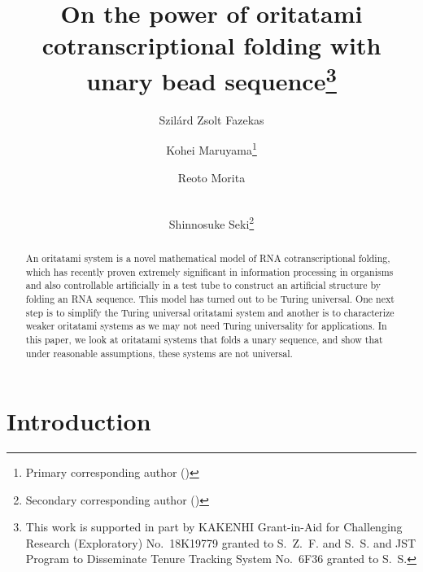 \documentclass[runningheads]{llncs}
\title{On the power of oritatami cotranscriptional folding with unary bead sequence\thanks{This work is supported in part by KAKENHI Grant-in-Aid for Challenging Research (Exploratory) No.~18K19779 granted to S.~Z.~F. and S.~S. and JST Program to Disseminate Tenure Tracking System No.~6F36 granted to S.~S.}
}
\author{
Szil\'{a}rd Zsolt Fazekas\inst{1} \and 
Kohei Maruyama\thanks{Primary corresponding author (\email{k.maruyama@uec.ac.jp})} \and
Reoto Morita \and \\
Shinnosuke Seki\inst{2}\thanks{Secondary corresponding author (\email{s.seki@uec.ac.jp})}
}
\institute{
Akita University, 
Graduate School of Engineering Science, 
1-1 Tegate Gakuen-machi, Akita, 0108502, Japan \\
\and
The University of Electro-Communications, 
Graduate School of Informatics and Engineering, 
1-5-1 Chofugaoka, Chofu, Tokyo, 1828585, Japan \\
}
\begin{document}
\maketitle

\begin{abstract}
An oritatami system is a novel mathematical model of RNA cotranscriptional folding, which has recently proven extremely significant in information processing in organisms and also controllable artificially in a test tube to construct an artificial structure by folding an RNA sequence.  
This model has turned out to be Turing universal. 
One next step is to simplify the Turing universal oritatami system and another is to characterize weaker oritatami systems as we may not need Turing universality for applications. 
In this paper, we look at oritatami systems that folds a unary sequence, and show that under reasonable assumptions, these systems are not universal.
\end{abstract}

	\section{Introduction}
\end{document}
